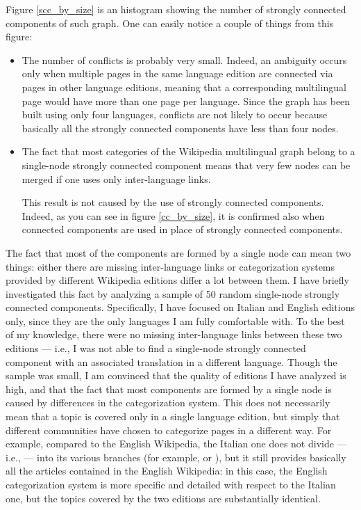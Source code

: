             Figure \ref{scc_by_size} is an histogram showing the number of strongly connected components of such graph. One can easily notice a couple of things from this figure:
            \begin{itemize}
                \item The number of conflicts is probably very small. Indeed, an ambiguity occurs only when multiple pages in the same language edition are connected via pages in other language editions, meaning that a corresponding multilingual page would have more than one page per language. Since the graph has been built using only four languages, conflicts are not likely to occur because basically all the strongly connected components have less than four nodes.
                \item The fact that most categories of the Wikipedia multilingual graph belong to a single-node strongly connected component means that very few nodes can be merged if one uses only inter-language links.
                
                This result is not caused by the use of strongly connected components. Indeed, as you can see in figure \ref{cc_by_size}, it is confirmed also when connected components are used in place of strongly connected components.
            \end{itemize}
        
            The fact that most of the components are formed by a single node can mean two things: either there are missing inter-language links or categorization systems provided by different Wikipedia editions differ a lot between them. I have briefly investigated this fact by analyzing a sample of 50 random single-node strongly connected components. Specifically, I have focused on Italian and English editions only, since they are the only languages I am fully comfortable with. To the best of my knowledge, there were no missing inter-language links between these two editions --- i.e., I was not able to find a single-node strongly connected component with an associated translation in a different language. Though the sample was small, I am convinced that the quality of editions I have analyzed is high, and that the fact that most components are formed by a single node is caused by differences in the categorization system. This does not necessarily mean that a topic is covered only in a single language edition, but simply that different communities have chosen to categorize pages in a different way. For example, compared to the English Wikipedia, the Italian one does not divide  --- i.e.,  --- into its various branches (for example,  or ), but it still provides basically all the articles contained in the English Wikipedia: in this case, the English categorization system is more specific and detailed with respect to the Italian one, but the topics covered by the two editions are substantially identical.
